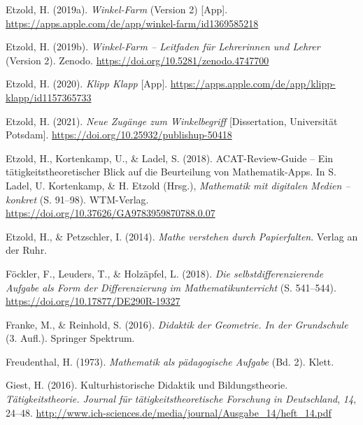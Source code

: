 \documentclass[
  ngerman,
]{scrbook}
\newlength{\cslhangindent}
\newlength{\cslentryspacingunit} %
\newenvironment{CSLReferences}[2] %
 {%
  \setlength{\parindent}{0pt}
  \ifodd #1
  \let\oldpar\par
  \def\par{\hangindent=\cslhangindent\oldpar}
  \fi
  \setlength{\parskip}{#2\cslentryspacingunit}
 }%
 {}
\theoremstyle{definition}
\theoremstyle{definition}
\theoremstyle{definition}
\theoremstyle{definition}
\theoremstyle{remark}
\begin{document}
\begin{CSLReferences}{1}{0}
\leavevmode{}%
Etzold, H. (2019a). \emph{Winkel-{Farm}} (Version 2) {[}App{]}. \url{https://apps.apple.com/de/app/winkel-farm/id1369585218}

\leavevmode{}%
Etzold, H. (2019b). \emph{Winkel-{Farm} -- {Leitfaden} für {Lehrerinnen} und {Lehrer}} (Version 2). Zenodo. \url{https://doi.org/10.5281/zenodo.4747700}

\leavevmode{}%
Etzold, H. (2020). \emph{Klipp {Klapp}} {[}App{]}. \url{https://apps.apple.com/de/app/klipp-klapp/id1157365733}

\leavevmode{}%
Etzold, H. (2021). \emph{Neue Zugänge zum Winkelbegriff} {[}Dissertation, Universität Potsdam{]}. \url{https://doi.org/10.25932/publishup-50418}

\leavevmode{}%
Etzold, H., Kortenkamp, U., \& Ladel, S. (2018). {ACAT}-{Review}-{Guide} -- {Ein} tätigkeitstheoretischer {Blick} auf die {Beurteilung} von {Mathematik}-{Apps}. In S. Ladel, U. Kortenkamp, \& H. Etzold (Hrsg.), \emph{Mathematik mit digitalen {Medien} -- konkret} (S. 91--98). WTM-Verlag. \url{https://doi.org/10.37626/GA9783959870788.0.07}

\leavevmode{}%
Etzold, H., \& Petzschler, I. (2014). \emph{Mathe verstehen durch {Papierfalten}}. Verlag an der Ruhr.

\leavevmode{}%
Föckler, F., Leuders, T., \& Holzäpfel, L. (2018). \emph{Die selbstdifferenzierende {Aufgabe} als {Form} der {Differenzierung} im {Mathematikunterricht}} (S. 541--544). \url{https://doi.org/10.17877/DE290R-19327}

\leavevmode{}%
Franke, M., \& Reinhold, S. (2016). \emph{Didaktik der {Geometrie}. {In} der {Grundschule}} (3. Aufl.). Springer Spektrum.

\leavevmode{}%
Freudenthal, H. (1973). \emph{Mathematik als pädagogische {Aufgabe}} (Bd. 2). Klett.

\leavevmode{}%
Giest, H. (2016). Kulturhistorische {Didaktik} und {Bildungstheorie}. \emph{Tätigkeitstheorie. Journal für tätigkeitstheoretische Forschung in Deutschland}, \emph{14}, 24--48. \url{http://www.ich-sciences.de/media/journal/Ausgabe_14/heft_14.pdf}


\end{CSLReferences}
\end{document}
